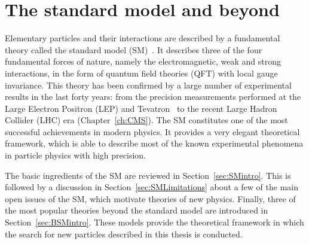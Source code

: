 \chapter{The standard model and beyond}
\label{ch:theory}

Elementary particles and their interactions are described by a fundamental theory called the standard model (SM)~\cite{QFTbook}.
It describes three of the four fundamental forces of nature, namely the electromagnetic, weak and strong interactions, in the form of quantum field theories (QFT) with local gauge invariance.
This theory has been confirmed by a large number of experimental results in the last forty years: from the precision measurements performed at the Large Electron Positron (LEP) and Tevatron~\cite{ALEPH:2010aa}
to the recent Large Hadron Collider (LHC) era (Chapter~\ref{ch:CMS}).
The SM constitutes one of the most successful achievements in modern physics.
It provides a very elegant theoretical framework, which is able to describe most of the known experimental phenomena in particle physics with high precision.

The basic ingredients of the SM are reviewed in Section~\ref{sec:SMintro}. This is followed by a discussion in Section~\ref{sec:SMLimitations} about a few of the main open issues of the SM, which motivate theories of new physics.
Finally, three of the most popular theories beyond the standard model are introduced in Section~\ref{sec:BSMintro}. These models provide the theoretical framework in which the search for new particles described in this thesis is conducted.

  

  
  
  
  
